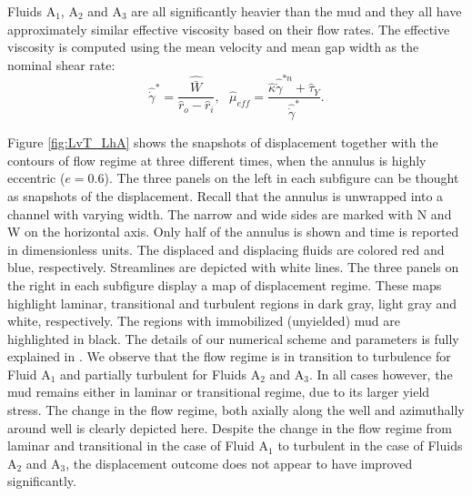 \documentclass[review]{elsarticle}
\begin{document}
Fluids A$_1$, A$_2$ and A$_3$ are all significantly heavier than the mud and they all have approximately similar effective viscosity based on their flow rates. The effective viscosity is computed using the mean velocity and mean gap width as the nominal shear rate: 
\begin{equation}\label{eq:nominal_gamma}
	\hat {\dot\gamma}^* = \frac{\hat {\bar W}}{\hat r_o - \hat r_i}, ~~~ \hat \mu_{eff} = \frac{\hat \kappa \hat {\dot\gamma}^{*n} + \hat \tau_Y}{\hat {\dot\gamma}^* }.
\end{equation}


Figure \ref{fig:LvT_LhA} shows the snapshots of displacement together with the contours of flow regime at three different times, when the annulus is highly eccentric ($e=0.6$). The three panels on the left in each subfigure can be thought as snapshots of the displacement. Recall that the annulus is unwrapped into a channel with varying width. The narrow and wide sides are marked with N and W on the horizontal axis. Only half of the annulus is shown and time is reported in dimensionless units. The displaced and displacing fluids are colored red and blue, respectively. Streamlines are depicted with white lines.  The three panels on the right in each subfigure display a map of displacement regime. These maps highlight laminar, transitional and turbulent regions in dark gray, light gray and white, respectively. The regions with immobilized (unyielded) mud are highlighted in black. The details of our numerical scheme and parameters is fully explained in \cite{Maleki2018c}. We observe that the flow regime is in transition to turbulence for Fluid A$_1$ and partially turbulent for Fluids A$_2$ and A$_3$. In all cases however, the mud remains either in laminar or transitional regime, due to its larger yield stress. The change in the flow regime, both axially along the well and azimuthally around well is clearly depicted here. Despite the change in the flow regime from laminar and transitional in the case of Fluid A$_1$ to turbulent in the case of Fluids A$_2$ and A$_3$, the displacement outcome does not appear to have improved significantly.   
\end{document}
